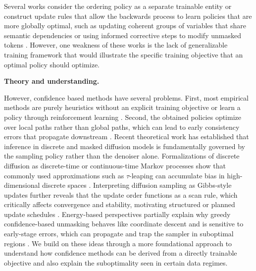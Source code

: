 Several works consider the ordering policy as a separate trainable entity \citep{peng2025path,jazbec2025learning} or construct update rules that allow the backwards process to learn policies that are more globally optimal, such as updating coherent groups of variables that share semantic dependencies \citep{meshchaninov2025guided} or using informed corrective steps to modify unmasked tokens \citep{zhao2024informed}. However, one weakness of these works is the lack of generalizable training framework that would illustrate the specific training objective that an optimal policy should optimize.


\textbf{Theory and understanding.} 

However, confidence based methods have several problems. First, most empirical methods are purely heuristics without an explicit training objective \citep{kim2025train} or learn a policy through reinforcement learning \citep{jazbec2025learning}. Second, the obtained policies optimize over local paths rather than global paths, which can lead to early consistency errors that propagate downstream \citep{chen2025beyond, hayakawa2025demystifying}. Recent theoretical work has established that inference in discrete and masked diffusion models is fundamentally governed by the sampling policy rather than the denoiser alone. Formalizations of discrete diffusion as discrete-time or continuous-time Markov processes show that commonly used approximations such as $\tau$-leaping can accumulate bias in high-dimensional discrete spaces \citep{austin2021structured, campbell2022continuous}. Interpreting diffusion sampling as Gibbs-style updates further reveals that the update order functions as a scan rule, which critically affects convergence and stability, motivating structured or planned update schedules \cite{hayakawa2025demystifying, peng2025path}. Energy-based perspectives partially explain why greedy confidence-based unmasking behaves like coordinate descent and is sensitive to early-stage errors, which can propagate and trap the sampler in suboptimal regions \cite{kholkin2025sampling, chen2025beyond}. We build on these ideas through a more foundational approach to understand how confidence methods can be derived from a directly trainable objective and also explain the suboptimality seen in certain data regimes.
\fi

